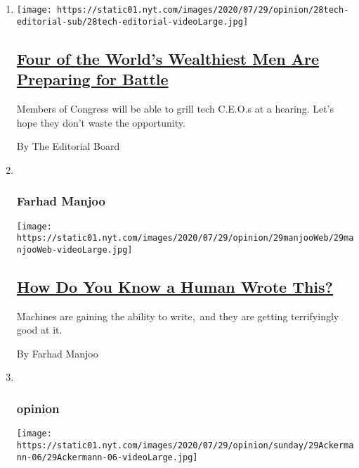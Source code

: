 \begin{enumerate}
\def\labelenumi{\arabic{enumi}.}
\item
  \texttt{[image: https://static01.nyt.com/images/2020/07/29/opinion/28tech-editorial-sub/28tech-editorial-videoLarge.jpg]}

  \hypertarget{four-of-the-worlds-wealthiest-men-are-preparing-for-battle}{%
  \subsection{\texorpdfstring{\href{/2020/07/28/opinion/tech-ceo-hearing-congress.html}{Four
  of the World's Wealthiest Men Are Preparing for
  Battle}}{Four of the World's Wealthiest Men Are Preparing for Battle}}\label{four-of-the-worlds-wealthiest-men-are-preparing-for-battle}}

  Members of Congress will be able to grill tech C.E.O.s at a hearing.
  Let's hope they don't waste the opportunity.

  By The Editorial Board
\item ~
  \hypertarget{farhad-manjoo}{%
  \subsubsection{Farhad Manjoo}\label{farhad-manjoo}}

  \texttt{[image: https://static01.nyt.com/images/2020/07/29/opinion/29manjooWeb/29manjooWeb-videoLarge.jpg]}

  \hypertarget{how-do-you-know-a-human-wrote-this}{%
  \subsection{\texorpdfstring{\href{/2020/07/29/opinion/gpt-3-ai-automation.html}{How
  Do You Know a Human Wrote
  This?}}{How Do You Know a Human Wrote This?}}\label{how-do-you-know-a-human-wrote-this}}

  Machines are gaining the ability to write,~and they are getting
  terrifyingly good at it.

  By Farhad Manjoo
\item ~
  \hypertarget{opinion-1}{%
  \subsubsection{opinion}\label{opinion-1}}

  \texttt{[image: https://static01.nyt.com/images/2020/07/29/opinion/sunday/29Ackermann-06/29Ackermann-06-videoLarge.jpg]}


\end{enumerate}
